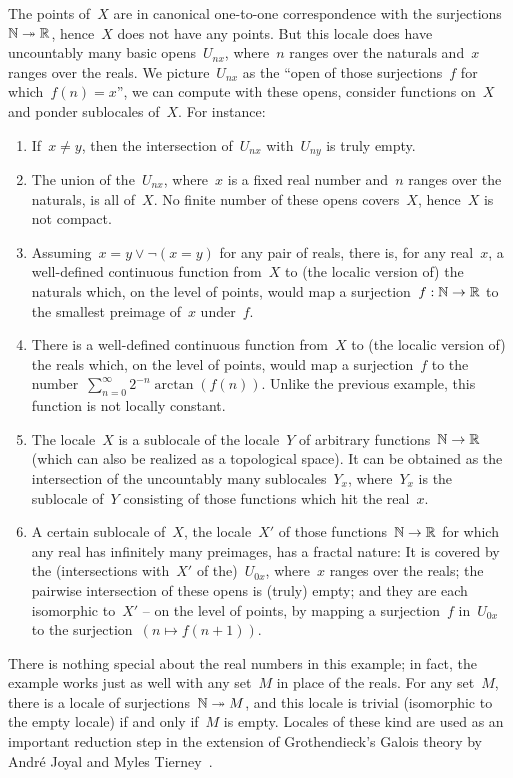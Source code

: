 \documentclass{ws-rv9x6}
\begin{document}
{The points of~$X$ are in canonical one-to-one correspondence with the
surjections~$\mathbb{N} \twoheadrightarrow \mathbb{R}$, hence~$X$ does not have any points.
But this locale does have uncountably many basic opens~$U_{nx}$, where~$n$
ranges over the naturals and~$x$ ranges over the reals. We picture~$U_{nx}$ as
the ``open of those surjections~$f$ for which~$f(n) = x$'', we can compute with
these opens, consider functions on~$X$ and ponder sublocales of~$X$. For instance:
\begin{enumerate}
\item If~$x \neq y$, then the intersection of~$U_{nx}$ with~$U_{ny}$
is truly empty.
\item The union of the~$U_{nx}$, where~$x$ is a fixed real
number and~$n$ ranges over the naturals, is all of~$X$. No finite number
of these opens covers~$X$, hence~$X$ is not compact.
\item Assuming~$x = y \vee \neg(x = y)$ for any pair of reals, there is, for any real~$x$, a well-defined continuous function from~$X$ to
(the localic version of) the naturals which, on the level of points, would map
a surjection~$f : \mathbb{N} \to \mathbb{R}$ to the smallest preimage of~$x$ under~$f$.
\item There is a well-defined continuous function from~$X$ to (the localic
version of) the reals which, on the level of points, would map a surjection~$f$
to the number~$\sum_{n=0}^\infty 2^{-n} \arctan(f(n))$. Unlike the previous
example, this function is not locally constant.
\item\label{item:intersection-sublocales} The locale~$X$ is a sublocale of the
locale~$Y$ of arbitrary functions~$\mathbb{N} \to \mathbb{R}$ (which can also be realized as
a topological space). It can be obtained as the intersection of the uncountably
many sublocales~$Y_x$, where~$Y_x$ is the sublocale of~$Y$ consisting of those
functions which hit the real~$x$.
\item A certain sublocale of~$X$, the locale~$X'$ of those functions~$\mathbb{N} \to
\mathbb{R}$ for which any real has infinitely many preimages, has a fractal nature: It
is covered by the (intersections with~$X'$ of the)~$U_{0x}$, where~$x$ ranges over the reals; the pairwise
intersection of these opens is (truly) empty; and they are each isomorphic
to~$X'$ -- on the level of points, by mapping a surjection~$f$ in~$U_{0x}$ to
the surjection~$(n \mapsto f(n+1))$.
\end{enumerate}

There is nothing special about the real numbers in this example;
in fact, the example works just as well with any set~$M$ in place of the reals.
For any set~$M$, there is a locale of surjections~$\mathbb{N} \twoheadrightarrow M$,
and this locale is trivial (isomorphic to the empty locale) if and only if~$M$
is empty. Locales of these kind are used as an important reduction step in the
extension of Grothendieck's Galois theory by André Joyal and
Myles Tierney~\cite[Section~V.3]{joyal-tierney:galois-theory}.


}
\end{document}
